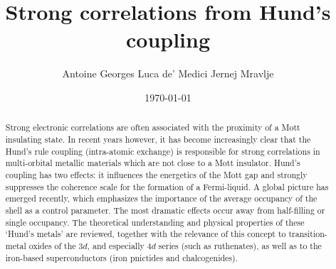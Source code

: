 \documentclass[]{ar2e-changed}%
\begin{document}

\title{Strong %
correlations from Hund's coupling}

\author{Antoine Georges
Luca de' Medici
Jernej Mravlje
}



\begin{abstract}
Strong electronic correlations are often associated with the proximity of a Mott insulating state. 
%
In recent years however, it has become increasingly clear that the  
Hund's rule coupling (intra-atomic exchange) is responsible for 
strong correlations in multi-orbital metallic materials which are not close 
to a Mott insulator. 
%
Hund's coupling has two effects: it influences the energetics of the Mott gap and strongly 
suppresses the coherence scale for the formation of a Fermi-liquid. 
%
A global picture has emerged recently, which emphasizes the importance of the 
average occupancy of the shell as a control parameter.  
The most dramatic effects occur away from half-filling or single occupancy. 
%
The theoretical understanding and physical properties of these `Hund's metals' are reviewed, together 
with the relevance of this concept to transition-metal oxides of the $3d$, and especially $4d$ series (such as ruthenates), 
as well as to the iron-based superconductors (iron pnictides and chalcogenides).
\end{abstract}
\date{\today}
\maketitle
\end{document}
